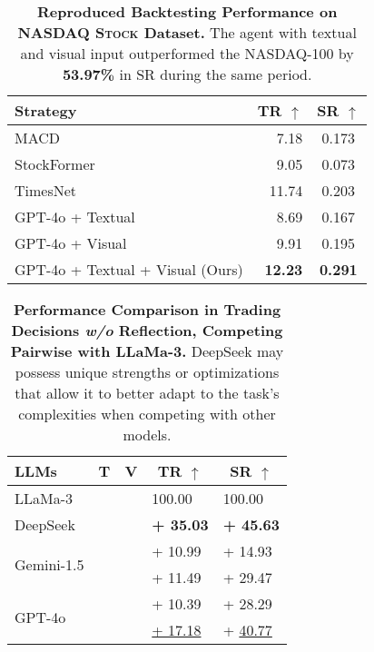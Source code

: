 \begin{table}
	\centering
	\footnotesize
	\setlength{\tabcolsep}{9pt}
	\begin{tabular}{lrc}
	\toprule[1.1pt]
	Strategy & \multicolumn{1}{c}{TR $\uparrow$} & SR $\uparrow$ \\
	\midrule
	MACD~\citep{macd} & 7.18 & 0.173 \\
	StockFormer~\citep{stockformer} & 9.05 & 0.073 \\
	TimesNet~\citep{timesnet} & 11.74 & 0.203 \\
	\midrule
	GPT-4o + Textual & 8.69 & 0.167 \\
	GPT-4o + Visual & 9.91 & 0.195 \\
	GPT-4o + Textual + Visual (Ours) & \textbf{12.23} & \textbf{0.291} \\
	\bottomrule[1.1pt]
	\end{tabular}
	\caption{\textbf{Reproduced Backtesting Performance on \textsc{NASDAQ Stock} Dataset.} The agent with textual and visual input outperformed the NASDAQ-100 by \textbf{53.97\%} in SR during the same period.}
	\label{real_data}
	\vspace{-3pt}
\end{table}

\begin{table}
	\centering
	\footnotesize
	\setlength{\tabcolsep}{10pt}
	\begin{tabular}{lccll}
	\toprule[1.1pt]
	LLMs & T & V & \multicolumn{1}{c}{TR $\uparrow$} & \multicolumn{1}{c}{SR $\uparrow$} \\
	\midrule
	LLaMa-3 & \CIRCLE & \Circle & 100.00 & 100.00 \\
	DeepSeek & \CIRCLE & \Circle & \textbf{+ 35.03} & \textbf{+ 45.63} \\
	\midrule
	\multirow{2}{*}{Gemini-1.5} & \CIRCLE & \Circle & + 10.99 & + 14.93 \\
	& \Circle & \CIRCLE & + 11.49 & + 29.47 \\
	\cmidrule(l){2-5}
	\multirow{2}{*}{GPT-4o} & \CIRCLE & \Circle & + 10.39 & + 28.29	\\
	& \Circle & \CIRCLE & \underline{+ 17.18} & + \underline{40.77} \\
	\bottomrule[1.1pt]
	\end{tabular}
	\caption{\textbf{Performance Comparison in Trading Decisions \textit{w/o} Reflection, Competing Pairwise with LLaMa-3.} DeepSeek may possess unique strengths or optimizations that allow it to better adapt to the task's complexities when competing with other models.}
	\label{ablation_experiment_text_vision}
	\vspace{-3pt}
\end{table}

